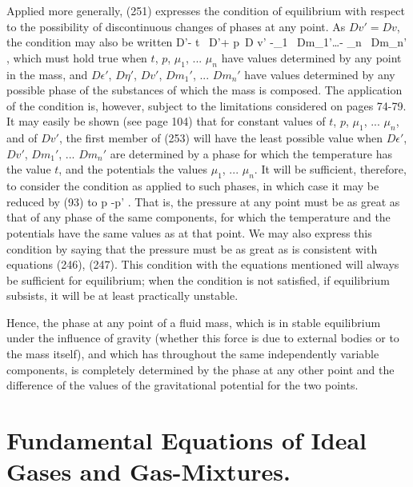\documentclass[12pt]{memoir}
\begin{document}
Applied more generally, (251) expresses the condition of equilibrium with respect to the possibility of discontinuous changes of phases at any point. As $Dv'= Dv$, the condition may also be written
\eqs D\epsilon'- t \, D\eta'+ p \,D v' -\mu_1 \, Dm_1'\dots - \mu_n \, Dm_n' , \label{253}\eqe
which must hold true when $t$, $p$, $\mu_1$, ... $\mu_n$ have values determined by any point in the mass, and $D\epsilon'$, $D\eta'$, $Dv'$, $Dm_1'$, ... $Dm_n'$ have values determined by any possible phase of the substances of which the mass is composed. The application of the condition is, however, subject to the limitations considered on pages 74-79. It may easily be shown (see page 104) that for constant values of $t$, $p$, $\mu_1$, ... $\mu_n$, and of $Dv'$, the first member of (253) will have the least possible value when $D\epsilon'$, $Dv'$, $Dm_1'$, ... $Dm_n'$ are determined by a phase for which the temperature has the value $t$, and the potentials the values $\mu_1$, ... $\mu_n$. It will be sufficient, therefore, to consider the condition as applied to such phases, in which case it may be reduced by (93) to
\eqs p -p' . \label{254}\eqe
That is, the pressure at any point must be as great as that of any phase of the same components, for which the temperature and the potentials have the same values as at that point. We may also express this condition by saying that the pressure must be as great as is consistent with equations (246), (247). This condition with the equations mentioned will always be sufficient for equilibrium; when the condition is not satisfied, if equilibrium subsists, it will be at least practically unstable.


Hence, the phase at any point of a fluid mass, which is in stable equilibrium under the influence of gravity (whether this force is due to external bodies or to the mass itself), and which has throughout the same independently variable components, is completely determined by the phase at any other point and the difference of the values of the gravitational potential for the two points.


\section{Fundamental Equations of Ideal Gases and Gas-Mixtures.}
\end{document}
